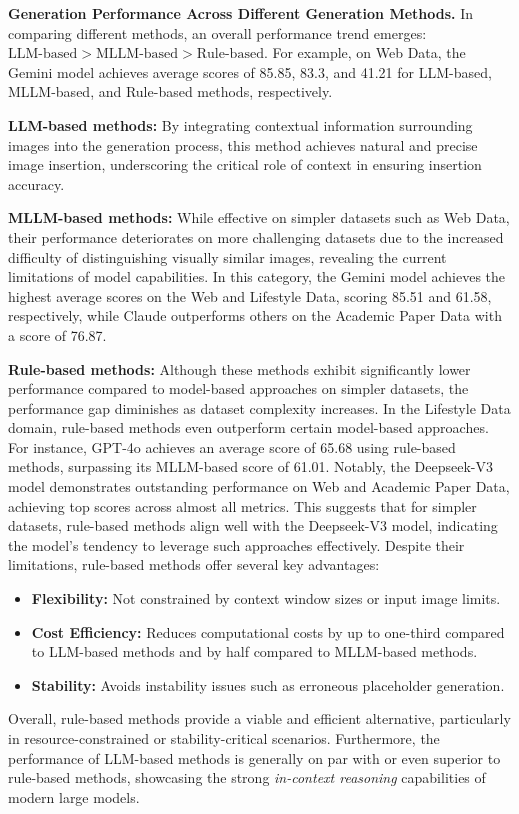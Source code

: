 
\textbf{Generation Performance Across Different Generation Methods.}  
In comparing different methods, an overall performance trend emerges: $\text{LLM-based} > \text{MLLM-based} > \text{Rule-based}$.  
For example, on Web Data, the Gemini model achieves average scores of 85.85, 83.3, and 41.21 for LLM-based, MLLM-based, and Rule-based methods, respectively.

\textbf{LLM-based methods:} By integrating contextual information surrounding images into the generation process, this method achieves natural and precise image insertion, underscoring the critical role of context in ensuring insertion accuracy.

\textbf{MLLM-based methods:} While effective on simpler datasets such as Web Data, their performance deteriorates on more challenging datasets due to the increased difficulty of distinguishing visually similar images, revealing the current limitations of model capabilities. In this category, the Gemini model achieves the highest average scores on the Web and Lifestyle Data, scoring 85.51 and 61.58, respectively, while Claude outperforms others on the Academic Paper Data with a score of 76.87.

\textbf{Rule-based methods:} Although these methods exhibit significantly lower performance compared to model-based approaches on simpler datasets, the performance gap diminishes as dataset complexity increases. In the Lifestyle Data domain, rule-based methods even outperform certain model-based approaches. For instance, GPT-4o achieves an average score of 65.68 using rule-based methods, surpassing its MLLM-based score of 61.01. Notably, the Deepseek-V3 model demonstrates outstanding performance on Web and Academic Paper Data, achieving top scores across almost all metrics. This suggests that for simpler datasets, rule-based methods align well with the Deepseek-V3 model, indicating the model's tendency to leverage such approaches effectively. Despite their limitations, rule-based methods offer several key advantages:  
\begin{itemize}
    \item \textbf{Flexibility:} Not constrained by context window sizes or input image limits.
    \item \textbf{Cost Efficiency:} Reduces computational costs by up to one-third compared to LLM-based methods and by half compared to MLLM-based methods.
    \item \textbf{Stability:} Avoids instability issues such as erroneous placeholder generation.
\end{itemize}
Overall, rule-based methods provide a viable and efficient alternative, particularly in resource-constrained or stability-critical scenarios. Furthermore, the performance of LLM-based methods is generally on par with or even superior to rule-based methods, showcasing the strong \textit{in-context reasoning} capabilities of modern large models.

